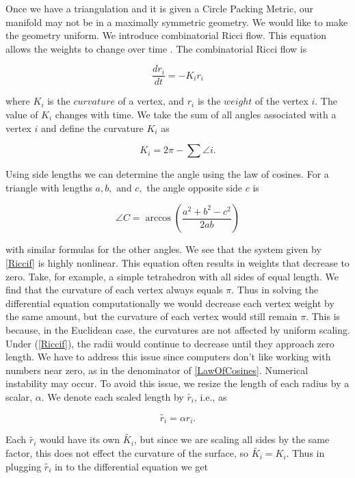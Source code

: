 \documentclass[12pt]{article}
\begin{document}
 Once we have a triangulation and it is given a Circle Packing Metric, our manifold may not be in a maximally symmetric geometry. We would like to make the geometry uniform. We introduce combinatorial Ricci flow. This equation allows the weights to change over time \cite{chowluo}. The combinatorial Ricci flow is

  \begin{equation}
  \label{Riccif}
  \frac{dr_i}{{dt}} = -K_ir_i
  \end{equation}
  
 where $K_i$ is the $curvature$ of a vertex, and $r_i$ is the $weight$ of the vertex $i$. The value of $K_i$ changes with time. We take the sum of all angles associated with a vertex $i$ and define the curvature $K_i$ as

\begin{equation}
K_i = 2\pi - \sum{\angle i}.
\end{equation}

Using side lengths we can determine the angle using the law of cosines. For a triangle with lengths $a, b,\mbox{ and }c,$ the angle opposite side $c$ is
  
  \begin{equation}
  \label{LawOfCosines}
  \angle C = \arccos(\frac{a^2 + b^2 - c^2}{2ab})
  \end{equation}
  
 with similar formulas for the other angles. We see that the system given by \ref{Riccif} is highly nonlinear. This equation often results in weights that decrease to zero. Take, for example, a simple tetrahedron with all sides of equal length. We find that the curvature of each vertex always equals $\pi$. Thus in solving the differential equation computationally we would decrease each vertex weight by the same amount, but the curvature of each vertex would still remain $\pi.$ This is because, in the Euclidean case, the curvatures are not affected by uniform scaling. Under (\ref{Riccif}), the radii would continue to decrease until they approach zero length. We have to address this issue since computers don't like working with numbers near zero, as in the denominator of \ref{LawOfCosines}. Numerical instability may occur. To avoid this issue, we resize the length of each radius by a scalar, $\alpha$. We denote each scaled length by $\tilde{r_i}$, i.e., as
 
$$ \tilde{r_i} = \alpha r_i. $$ 
 
 Each $\tilde{r_i}$ would have its own $\tilde{K_i}$, but since we are scaling all sides by the same factor, this does not effect the curvature of the surface, so $\tilde{K_i} = K_i$. Thus in plugging $\tilde{r_i}$ in to the differential equation we get
 
\end{document}
